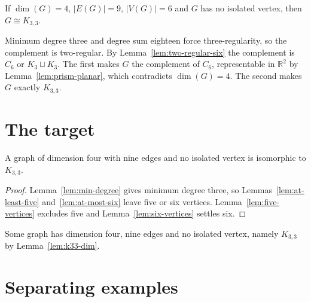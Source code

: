 \begin{lemma}
  \label{lem:six-vertices}
  \leanok
  If $\dim(G) = 4$, $|E(G)| = 9$, $|V(G)| = 6$ and $G$ has no isolated vertex, then
  $G \cong K_{3,3}$.

  Minimum degree three and degree sum eighteen force three-regularity, so the complement is
  two-regular. By Lemma~\ref{lem:two-regular-six} the complement is $C_6$ or $K_3 \sqcup K_3$.
  The first makes $G$ the complement of $C_6$, representable in $\mathbb{R}^2$ by
  Lemma~\ref{lem:prism-planar}, which contradicts $\dim(G) = 4$. The second makes $G$ exactly
  $K_{3,3}$.
\end{lemma}

\section{The target}

\begin{theorem}
  \label{thm:target}
  \leanok
  A graph of dimension four with nine edges and no isolated vertex is isomorphic to $K_{3,3}$.
\end{theorem}

\begin{proof}
  Lemma~\ref{lem:min-degree} gives minimum degree three, so
  Lemmas~\ref{lem:at-least-five} and~\ref{lem:at-most-six} leave five or six vertices.
  Lemma~\ref{lem:five-vertices} excludes five and Lemma~\ref{lem:six-vertices} settles six.
\end{proof}

\begin{theorem}
  \label{thm:witness}
  \leanok
  Some graph has dimension four, nine edges and no isolated vertex, namely $K_{3,3}$ by
  Lemma~\ref{lem:k33-dim}.
\end{theorem}

\section{Separating examples}

